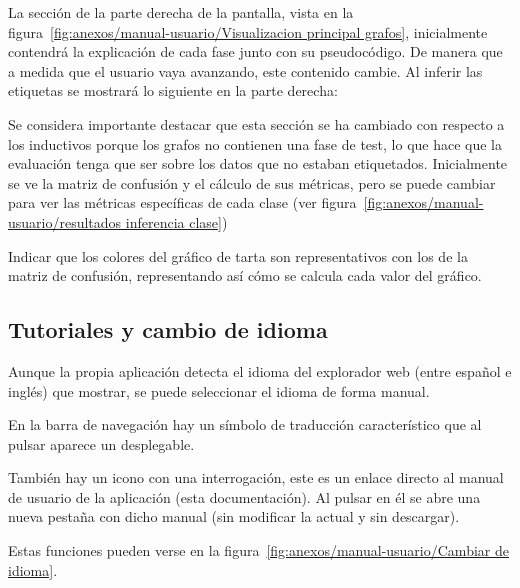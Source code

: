 
La sección de la parte derecha de la pantalla, vista en la figura~\ref{fig:anexos/manual-usuario/Visualizacion principal grafos}, inicialmente contendrá la explicación de cada fase junto con su pseudocódigo. De manera que a medida que el usuario vaya avanzando, este contenido cambie. Al inferir las etiquetas se mostrará lo siguiente en la parte derecha:


Se considera importante destacar que esta sección se ha cambiado con respecto a los inductivos porque los grafos no contienen una fase de test, lo que hace que la evaluación tenga que ser sobre los datos que no estaban etiquetados. Inicialmente se ve la matriz de confusión y el cálculo de sus métricas, pero se puede cambiar para ver las métricas específicas de cada clase (ver figura~\ref{fig:anexos/manual-usuario/resultados inferencia clase}) 


Indicar que los colores del gráfico de tarta son representativos con los de la matriz de confusión, representando así cómo se calcula cada valor del gráfico.
\subsection{Tutoriales y cambio de idioma}

Aunque la propia aplicación detecta el idioma del explorador web (entre español e inglés) que mostrar, se puede seleccionar el idioma de forma manual.

En la barra de navegación hay un símbolo de traducción característico que al pulsar aparece un desplegable.

También hay un icono con una interrogación, este es un enlace directo al manual de usuario de la aplicación (esta documentación). Al pulsar en él se abre una nueva pestaña con dicho manual (sin modificar la actual y sin descargar).

Estas funciones pueden verse en la figura~\ref{fig:anexos/manual-usuario/Cambiar
de idioma}.


